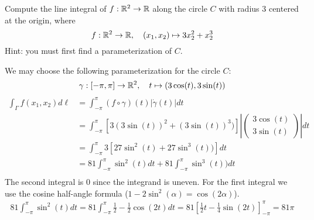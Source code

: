 \documentclass[11pt]{article}
\begin{document}
\begin{exercise}
    Compute the line integral of $f : \mathbb{R}^2 \rightarrow \mathbb{R}$ 
    along the circle $C$ with radius $3$ centered at the origin, where 
    \[
        f : \mathbb{R}^2 \to \mathbb{R}, \quad (x_1,x_2) \mapsto 3 x_2^2 + x_2^3
    \]
    Hint: you must first find a parameterization of $C$. 
\end{exercise}
\begin{solution} 
	We may choose the following parameterization for the circle $C$:
    $$
        \gamma : [-\pi,\pi] \rightarrow \mathbb{R}^2, \quad t \mapsto ( 3\cos(t), 3\sin(t) )
    $$
    \begin{align*}
        \int_{\Gamma} f(x_1,x_2) d\ell &= \int_{-\pi}^{\pi} (f\circ \gamma)(t)|\dot{\gamma}(t)|dt
        \\&=
        \int_{-\pi}^{\pi} \left[3(3\sin(t))^2+(3\sin(t))^3)\right]\left|\begin{pmatrix}3\cos(t)\\3\sin(t)\end{pmatrix}\right| dt
        \\&=
        \int_{-\pi}^{\pi} 3\left[27\sin^2(t)+27\sin^3(t))\right]dt
        \\&=
        81\int_{-\pi}^{\pi} \sin^2(t)dt+ 81\int_{-\pi}^{\pi}\sin^3(t))dt\\
    \end{align*}
    The second integral is $0$ since the integrand is uneven. For the first integral we use the cosine half-angle formula ($1 - 2\sin^2(\alpha) = \cos(2\alpha)$).
    \begin{align*}
        81\int_{-\pi}^{\pi} \sin^2(t)dt
		= 81\int_{-\pi}^{\pi} \frac{1}{2} - \frac{1}{2}\cos(2t)dt
        = 81 \left[ \frac{1}{2} t - \frac{1}{4}\sin(2t) \right]_{-\pi}^{\pi} = 81\pi
    \end{align*}
\end{solution}
\end{document}
